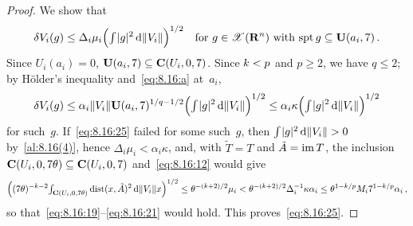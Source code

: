 \begin{proof}
    We show that
    \begin{equation}
        \label{eq:8.16:25}
        \delta V_i(g) \le \Delta_i \mu_i \Big( {\textstyle\int_{}^{}} |g|^2 \,\mathrm{d} \|V_i\| \Big)^{1/2} \quad
        \text{for $g \in \mathscr{X}(\mathbf{R}^{n})$ with $\operatorname{spt} g \subseteq \mathbf{U}(a_i,7)$} \,.
    \end{equation}
    Since $U_i(a_i) = 0$, $\mathbf{U}(a_i,7) \subseteq \mathbf{C} ( U_i, 0, 7 )$. Since $k < p$ and $p
    \ge 2$, we have $q \le 2$; by H\"older's inequality and~\eqref{eq:8.16:a} at~$a_i$,
    \begin{displaymath}
        \delta V_i(g) \le \alpha_i \|V_i\| \mathbf{U}(a_i,7)^{1/q - 1/2} \Big( {\textstyle\int_{}^{}} |g|^2 \,\mathrm{d}
        \|V_i\| \Big)^{1/2} \le \alpha_i \kappa \Big( {\textstyle\int_{}^{}} |g|^2 \,\mathrm{d} \|V_i\| \Big)^{1/2}
    \end{displaymath}
    for such~$g$. If~\eqref{eq:8.16:25} failed for some such~$g$, then ${\textstyle\int_{}^{}} |g|^2 \,\mathrm{d}
    \|V_i\| > 0$ by~\ref{al:8.16(4)}, hence $\Delta_i \mu_i < \alpha_i \kappa$, and, with $\tilde T
    = T$ and $\tilde A = \operatorname{im} T$, the inclusion $\mathbf{C} ( U_i, 0, 7\theta ) \subseteq
    \mathbf{C} ( U_i, 0, 7 )$ and~\eqref{eq:8.16:12} would give
    \begin{displaymath}
        \Big( (7 \theta)^{-k-2} {\textstyle\int_{\mathbf{C} ( U_i, 0, 7 \theta )}^{}} \operatorname{dist}(x, \tilde A)^2 \,\mathrm{d}
        \|V_i\| x \Big)^{1/2} \le \theta^{-(k+2)/2} \mu_i < \theta^{-(k+2)/2}
        \Delta_i^{-1} \kappa \alpha_i \le \theta^{1 - k/p} M_i 7^{1 - k/p} \alpha_i \,,
    \end{displaymath}
    so that~\eqref{eq:8.16:19}--\eqref{eq:8.16:21} would hold. This proves~\eqref{eq:8.16:25}.


\end{proof}
